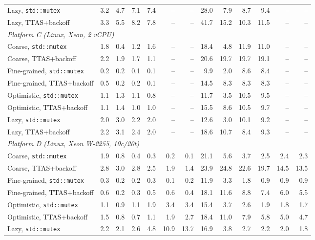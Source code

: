 \begin{tabular}{lrrrrrrrrrrrr}
Lazy, \texttt{std::mutex} & 3.2 & 4.7 & 7.1 & 7.4 & -- & -- & 28.0 & 7.9 & 8.7 & 9.4 & -- & -- \\
Lazy, TTAS+backoff & 3.3 & 5.5 & 8.2 & 7.8 & -- & -- & 41.7 & 15.2 & 10.3 & 11.5 & -- & -- \\
\midrule
\multicolumn{13}{l}{\emph{Platform C (Linux, Xeon, 2 vCPU)}} \\
Coarse, \texttt{std::mutex} & 1.8 & 0.4 & 1.2 & 1.6 & -- & -- & 18.4 & 4.8 & 11.9 & 11.0 & -- & -- \\
Coarse, TTAS+backoff & 2.2 & 1.9 & 1.7 & 1.1 & -- & -- & 20.6 & 19.7 & 19.7 & 19.1 & -- & -- \\
Fine-grained, \texttt{std::mutex} & 0.2 & 0.2 & 0.1 & 0.1 & -- & -- & 9.9 & 2.0 & 8.6 & 8.4 & -- & -- \\
Fine-grained, TTAS+backoff & 0.5 & 0.2 & 0.2 & 0.1 & -- & -- & 14.5 & 8.3 & 8.3 & 8.3 & -- & -- \\
Optimistic, \texttt{std::mutex} & 1.1 & 1.3 & 1.1 & 0.8 & -- & -- & 11.7 & 3.5 & 10.5 & 9.5 & -- & -- \\
Optimistic, TTAS+backoff & 1.1 & 1.4 & 1.0 & 1.0 & -- & -- & 15.5 & 8.6 & 10.5 & 9.7 & -- & -- \\
Lazy, \texttt{std::mutex} & 2.0 & 3.0 & 2.2 & 2.0 & -- & -- & 12.6 & 3.0 & 10.1 & 9.2 & -- & -- \\
Lazy, TTAS+backoff & 2.2 & 3.1 & 2.4 & 2.0 & -- & -- & 18.6 & 10.7 & 8.4 & 9.3 & -- & -- \\
\midrule
\multicolumn{13}{l}{\emph{Platform D (Linux, Xeon W-2255, 10c/20t)}} \\
Coarse, \texttt{std::mutex} & 1.9 & 0.8 & 0.4 & 0.3 & 0.2 & 0.1 & 21.1 & 5.6 & 3.7 & 2.5 & 2.4 & 2.3 \\
Coarse, TTAS+backoff & 2.8 & 3.0 & 2.8 & 2.5 & 1.9 & 1.4 & 23.9 & 24.8 & 22.6 & 19.7 & 14.5 & 13.5 \\
Fine-grained, \texttt{std::mutex} & 0.3 & 0.2 & 0.2 & 0.3 & 0.1 & 0.2 & 11.9 & 3.3 & 1.8 & 0.9 & 0.9 & 0.9 \\
Fine-grained, TTAS+backoff & 0.6 & 0.2 & 0.3 & 0.5 & 0.6 & 0.4 & 18.1 & 11.6 & 8.8 & 7.4 & 6.0 & 5.5 \\
Optimistic, \texttt{std::mutex} & 1.1 & 0.9 & 1.1 & 1.9 & 3.4 & 3.4 & 15.4 & 3.7 & 2.6 & 1.9 & 1.8 & 1.7 \\
Optimistic, TTAS+backoff & 1.5 & 0.8 & 0.7 & 1.1 & 1.9 & 2.7 & 18.4 & 11.0 & 7.9 & 5.8 & 5.0 & 4.7 \\
Lazy, \texttt{std::mutex} & 2.2 & 2.1 & 2.6 & 4.8 & 10.9 & 13.7 & 16.9 & 3.8 & 2.7 & 2.2 & 2.0 & 1.8 \\

\end{tabular}
